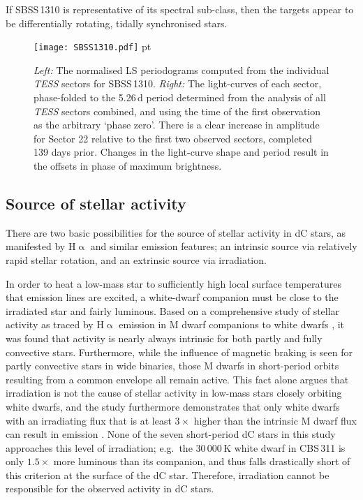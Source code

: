 \documentclass[fleqn,usenatbib,useAMS]{mnras}
\begin{document}
If SBSS\,1310 is representative of its spectral sub-class, then the targets appear to be differentially rotating, tidally synchronised stars.


\begin{figure*}
\texttt{[image: SBSS1310.pdf]}
 pt
\caption{\textit{Left:} The normalised LS periodograms computed from the individual \textit{TESS} sectors for SBSS\,1310. \textit{Right:} The light-curves of each sector, phase-folded to the 5.26\,d period determined from the analysis of all \textit{TESS} sectors combined, and using the time of the first observation as the arbitrary `phase zero'.  There is a clear increase in amplitude for Sector 22 relative to the first two observed sectors, completed 139 days prior.  Changes in the light-curve shape and period result in the offsets in phase of maximum brightness.}
\label{fig:SBSS}
\end{figure*}


\subsection{Source of stellar activity}

There are two basic possibilities for the source of stellar activity in dC stars, as manifested by H$\upalpha$ and similar emission features; an intrinsic source via relatively rapid stellar rotation, and an extrinsic source via irradiation.  

In order to heat a low-mass star to sufficiently high local surface temperatures that emission lines are excited, a white-dwarf companion must be close to the irradiated star and fairly luminous.  Based on a comprehensive study of stellar activity as traced by H$\upalpha$ emission in M dwarf companions to white dwarfs \citep{Rebassa13}, it was found that activity is nearly always intrinsic for both partly and fully convective stars.  Furthermore, while the influence of magnetic braking is seen for partly convective stars in wide binaries, those M dwarfs in short-period orbits resulting from a common envelope all remain active.  This fact alone argues that irradiation is not the cause of stellar activity in low-mass stars closely orbiting white dwarfs, and the study furthermore demonstrates that only white dwarfs with an irradiating flux that is at least $3\times$ higher than the intrinsic M dwarf flux can result in emission \citep{Rebassa13}.  None of the seven short-period dC stars in this study approaches this level of irradiation; e.g.\ the 30\,000\,K white dwarf in CBS\,311 is only $1.5\times$ more luminous than its companion, and thus falls drastically short of this criterion at the surface of the dC star.  Therefore, irradiation cannot be responsible for the observed activity in dC stars.
\end{document}
